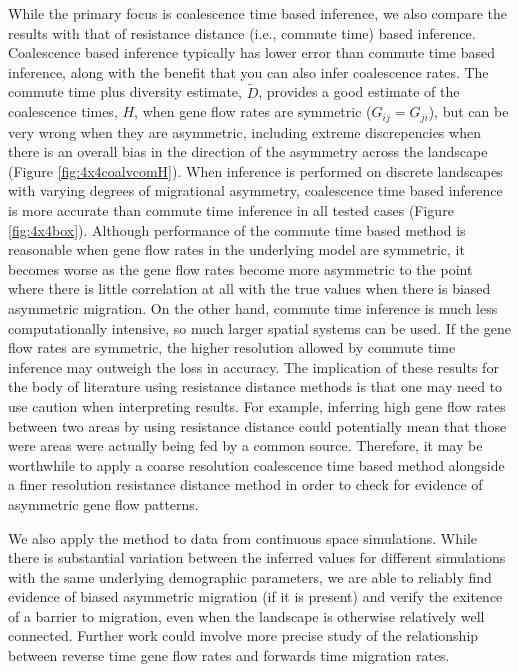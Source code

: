 \documentclass{article}
\newcommand{\Dcom}{\widetilde D}
\begin{document}
While the primary focus is coalescence time based inference,
we also compare the results with that of resistance distance (i.e., commute time) based inference.
Coalescence based inference typically has lower error than commute time based inference,
along with the benefit that you can also infer coalescence rates. 
The commute time plus diversity estimate, $\Dcom$, 
provides a good estimate of the coalescence times, $H$,
when gene flow rates are symmetric ($G_{ij} = G_{ji}$), 
but can be very wrong when they are asymmetric, 
including extreme discrepencies 
when there is an overall bias in the direction of the asymmetry across the landscape 
(Figure \ref{fig:4x4coalvcomH}).
When inference is performed on discrete landscapes 
with varying degrees of migrational asymmetry, 
coalescence time based inference is more accurate than commute time inference in all tested cases
(Figure \ref{fig:4x4box}).
Although performance of the commute time based method is reasonable 
when gene flow rates in the underlying model are symmetric, 
it becomes worse as the gene flow rates become more asymmetric 
to the point where there is little correlation at all with the true values 
when there is biased asymmetric migration.
On the other hand, commute time inference is much less computationally intensive, 
so much larger spatial systems can be used.
If the gene flow rates are symmetric, the higher resolution allowed by commute time inference
may outweigh the loss in accuracy.
The implication of these results for the body of literature using resistance distance methods
is that one may need to use caution when interpreting results.
For example, inferring high gene flow rates between two areas by using resistance distance
could potentially mean that those were areas were actually being fed by a common source.
Therefore, it may be worthwhile to apply a coarse resolution coalescence time based method 
alongside a finer resolution resistance distance method 
in order to check for evidence of asymmetric gene flow patterns.

We also apply the method to data from continuous space simulations. 
While there is substantial variation between the inferred values 
for different simulations with the same underlying demographic parameters, 
we are able to reliably find evidence of biased asymmetric migration (if it is present)
and verify the exitence of a barrier to migration, 
even when the landscape is otherwise relatively well connected.
Further work could involve more precise study of the relationship
between reverse time gene flow rates and forwards time migration rates.
\end{document}
